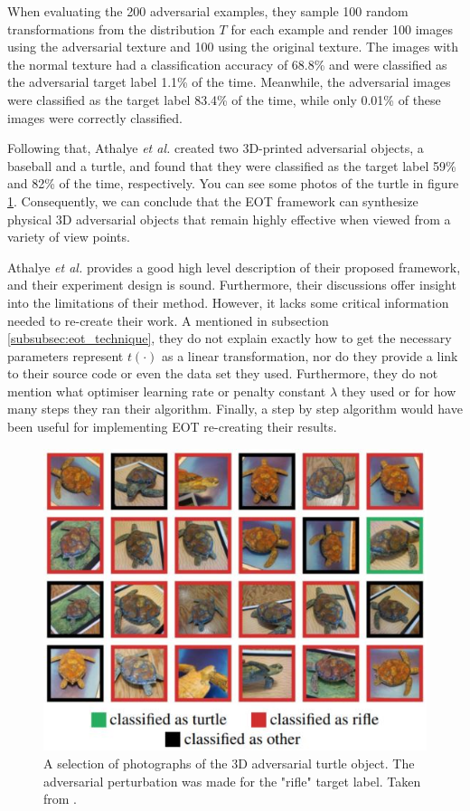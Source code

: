 When evaluating the 200 adversarial examples, they sample 100 random transformations from the distribution $T$ for each example and render 100 images using the adversarial texture and 100 using the original texture. The images with the normal texture had a classification accuracy of 68.8\% and were classified as the adversarial target label 1.1\% of the time. Meanwhile, the adversarial images were classified as the target label 83.4\% of the time, while only 0.01\% of these images were correctly classified.

Following that, Athalye \textit{et al.} created two 3D-printed adversarial objects, a baseball and a turtle, and found that they were classified as the target label 59\% and 82\% of the time, respectively. You can see some photos of the turtle in figure \ref{fig:3d_turtle}. Consequently, we can conclude that the EOT framework can synthesize physical 3D adversarial objects that remain highly effective when viewed from a variety of view points.

Athalye \textit{et al.} \cite{athalye} provides a good high level description of their proposed framework, and their experiment design is sound. Furthermore, their discussions offer insight into the limitations of their method. However, it lacks some critical information needed to re-create their work. A mentioned in subsection \ref{subsubsec:eot_technique}, they do not explain exactly how to get the necessary parameters represent $t(\cdot)$ as a linear transformation, nor do they provide a link to their source code or even the data set they used. Furthermore, they do not mention what optimiser learning rate or penalty constant $\lambda$ they used or for how many steps they ran their algorithm. Finally, a step by step algorithm would have been useful for implementing EOT re-creating their results.

\begin{figure}[h]
    \centering
    \includegraphics[width=1\textwidth]{graphics/turtle.JPG}
    \caption{A selection of photographs of the 3D adversarial turtle object. The adversarial perturbation was made for the "rifle" target label. Taken from \cite{athalye}.}
    \label{fig:3d_turtle}
\end{figure}

